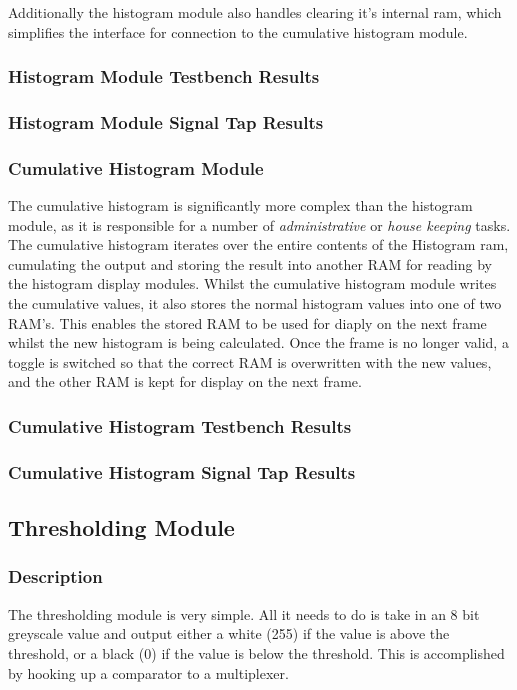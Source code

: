\documentclass[12pt]{article}
\begin{document}
  Additionally the histogram module also handles clearing it's internal ram, which simplifies the interface for connection to the cumulative histogram module.
  
  \subsubsection{Histogram Module Testbench Results}

  \subsubsection{Histogram Module Signal Tap Results}
  
  \subsubsection{Cumulative Histogram Module}
  The cumulative histogram is significantly more complex than the histogram module, as it is responsible for a number of \textit{administrative} or \textit{house keeping} tasks. The cumulative histogram iterates over the entire contents of the Histogram ram, cumulating the output and storing the result into another RAM for reading by the histogram display modules. Whilst the cumulative histogram module writes the cumulative values, it also stores the normal histogram values into one of two RAM's. This enables the stored RAM to be used for diaply on the next frame whilst the new histogram is being calculated. Once the frame is no longer valid, a toggle is switched so that the correct RAM is overwritten with the new values, and the other RAM is kept for display on the next frame.

  \subsubsection{Cumulative Histogram Testbench Results}

  \subsubsection{Cumulative Histogram Signal Tap Results}


  \subsection{Thresholding Module}
  \subsubsection{Description}
  The thresholding module is very simple. All it needs to do is take in an 8 bit greyscale value and output either a white (255) if the value is above the threshold, or a black (0) if the value is below the threshold. This is accomplished by hooking up a comparator to a multiplexer.
  
\end{document}

